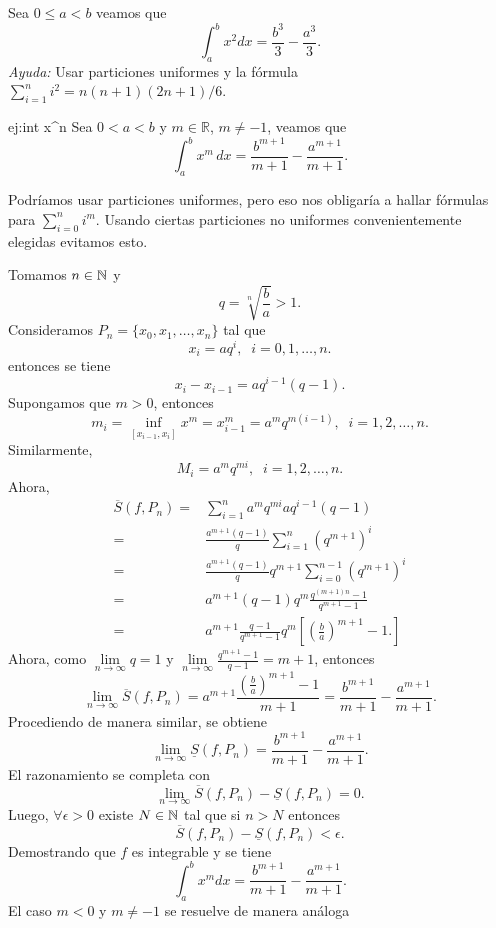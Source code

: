 \begin{ejercicio}{} Sea $0\leq a<b$ veamos que 
\[
 \int_a^b x^2 dx=\frac{b^3}{3}-\frac{a^3}{3}.
\]
{\em Ayuda:} Usar particiones uniformes y la fórmula $\sum_{i=1}^n i^2= n(n+1)(2n+1)/6$.
\end{ejercicio}

\begin{ejemplo}{ej:int x^n} Sea $0< a<b$ y $m\in\mathbb{R}$, $m\neq -1$,  veamos que 
\[
 \int_a^b x^m \,dx=\frac{b^{m+1}}{m+1}-\frac{a^{m+1}}{m+1}.
\]

\begin{demo}
Podr\'iamos usar particiones uniformes, pero eso nos obligar\'ia a hallar f\'ormulas para $\sum\limits_{i=0}^n{i^m}$. Usando ciertas particiones no uniformes convenientemente elegidas evitamos esto. 

Tomamos $n \in \mathbb{N}$ y 
\[
q=\sqrt[n]{\frac{b}{a}}>1.
\]
Consideramos $P_n=\{x_0,x_1,\ldots,x_n\}$ tal que
\[
x_i=aq^i, \;\;i=0,1,\ldots,n.
\]
entonces se tiene
\[
x_i-x_{i-1}=aq^{i-1}(q-1).
\]
Supongamos que $m>0$, entonces
\[
m_i=\inf\limits_{[x_{i-1},x_i]} x^m=x_{i-1}^m=a^m q^{m(i-1)}, \;\;i=1,2,\ldots,n.
\]
Similarmente, 
\[
M_i=a^mq^{mi},\;\;i=1,2,\ldots,n.
\]
Ahora, 
\[
\begin{split}
\overline{S}(f,P_n)=&
\sum\limits_{i=1}^n a^m q^{mi} aq^{i-1}(q-1)
\\
=&\frac{a^{m+1}(q-1)}{q}
\sum\limits_{i=1}^n (q^{m+1})^i
\\
=& \frac{a^{m+1}(q-1)}{q}q^{m+1}
\sum\limits_{i=0}^{n-1} (q^{m+1})^i
\\
=& a^{m+1}(q-1) q^m 
\frac{q^{(m+1)n }-1}{q^{m+1}-1}
\\
=&
a^{m+1}  \frac{q-1}{q^{m+1}-1} q^m \left[ \left(\frac{b}{a}\right)^{m+1}-1.\right]
\end{split}
\]
Ahora, como $\lim\limits_{n \to \infty} q=1$ y 
$
\lim\limits_{n \to \infty} \frac{q^{m+1}-1}{q-1}=m+1
$, entonces
\[
\lim\limits_{n \to \infty} \overline{S}(f,P_n)=a^{m+1}
\frac{\left(\frac{b}{a}\right)^{m+1}-1}{m+1}=\frac{b^{m+1}}{m+1}-\frac{a^{m+1}}{m+1}.
\]
Procediendo de manera similar, se obtiene
\[
\lim\limits_{n \to \infty} \underline{S}(f,P_n)=
\frac{b^{m+1}}{m+1}-\frac{a^{m+1}}{m+1}.
\]
El razonamiento se completa con 
\[
\lim\limits_{n \to \infty}
\overline{S}(f,P_n)-\underline{S}(f, P_n)=0.
\]
Luego, $\forall \epsilon>0$ existe $N\in \mathbb{N}$ tal que si $n>N$ entonces
\[\overline{S}(f,P_n)-\underline{S}(f, P_n)<\epsilon.\]
Demostrando que $f$ es integrable y se tiene
\[\int_a^b x^m dx=\frac{b^{m+1}}{m+1}-\frac{a^{m+1}}{m+1}.\]
El caso  $m<0$  y $m \neq -1$ se resuelve de manera an\'aloga
\end{demo}
\end{ejemplo}

